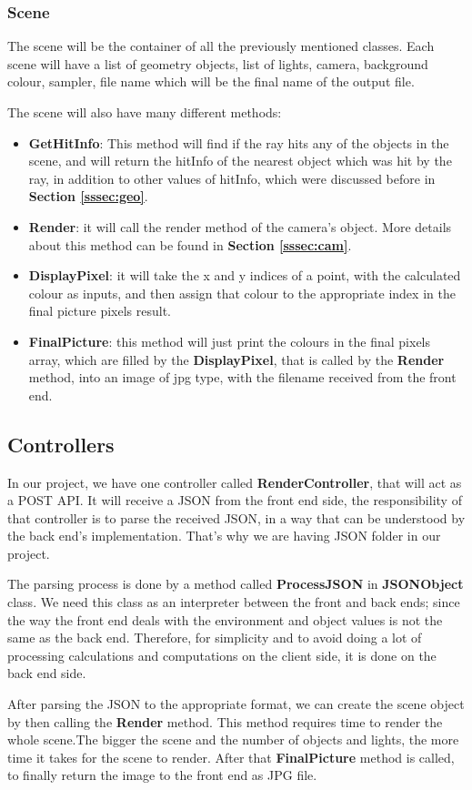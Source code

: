 \documentclass[a4paper]{report}
\begin{document}
	\subsubsection{Scene}
	The scene will be the container of all the previously mentioned classes. Each scene will have a list of geometry objects, list of lights, camera, background colour, sampler, file name which will be the final name of the output file.\newline
	\par The scene will also have many different methods:
	\begin{itemize}
		\item \textbf{GetHitInfo}: This method will find if the ray hits any of the objects in the scene, and will return the hitInfo of the nearest object which was hit by the ray, in addition to other values of hitInfo, which were discussed before in \textbf{Section \ref{sssec:geo}}.
		\item \textbf{Render}: it will call the render method of the camera's object. More details about this method can be found in \textbf{Section \ref{sssec:cam}}.
		\item \textbf{DisplayPixel}: it will take the x and y indices of a point, with the calculated colour as inputs, and then assign that colour to the appropriate index in the final picture pixels result.
		\item \textbf{FinalPicture}: this method will just print the colours in the final pixels array, which are filled by the \textbf{DisplayPixel}, that is called by the \textbf{Render} method, into an image of jpg type, with the filename received from the front end.
	\end{itemize}
	\subsection{Controllers}
	In our project, we have one controller called \textbf{RenderController}, that will act as a POST API. It will receive a JSON from the front end side, the responsibility of that controller is to parse the received JSON, in a way that can be understood by the back end's implementation. That's why we are having JSON folder in our project.\newline
	\par The parsing process is done by a method called \textbf{ProcessJSON} in \textbf{JSONObject} class. We need this class as an interpreter between the front and back ends; since the way the front end deals with the environment and object values is not the same as the back end. Therefore, for simplicity and to avoid doing a lot of processing calculations and computations on the client side, it is done on the back end side.\newline
	\par After parsing the JSON to the appropriate format, we can create the scene object by then calling the \textbf{Render} method. This method requires time to render the whole scene.The bigger the scene and the number of objects and lights, the more time it takes for the scene to render. After that \textbf{FinalPicture} method is called, to finally return the image to the front end as JPG file.
\end{document}
